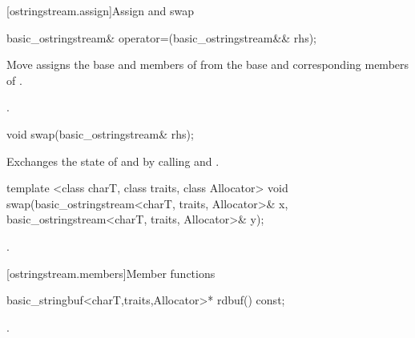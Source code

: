 [ostringstream.assign]{Assign and swap}

%
%
\begin{itemdecl}
basic_ostringstream& operator=(basic_ostringstream&& rhs);
\end{itemdecl}

\begin{itemdescr}
\pnum
\effects Move assigns the base and members of  from the base and corresponding
members of .

\pnum
\returns {}.
\end{itemdescr}

%
%
\begin{itemdecl}
void swap(basic_ostringstream& rhs);
\end{itemdecl}

\begin{itemdescr}
\pnum
\effects Exchanges the state of  and
 by calling
 and
.
\end{itemdescr}


%
%
\begin{itemdecl}
template <class charT, class traits, class Allocator>
void swap(basic_ostringstream<charT, traits, Allocator>& x,
          basic_ostringstream<charT, traits, Allocator>& y);
\end{itemdecl}

\begin{itemdescr}
\pnum
\effects {}.
\end{itemdescr}

[ostringstream.members]{Member functions}

%
\begin{itemdecl}
basic_stringbuf<charT,traits,Allocator>* rdbuf() const;
\end{itemdecl}

\begin{itemdescr}
\pnum
\returns
{}.
\end{itemdescr}

